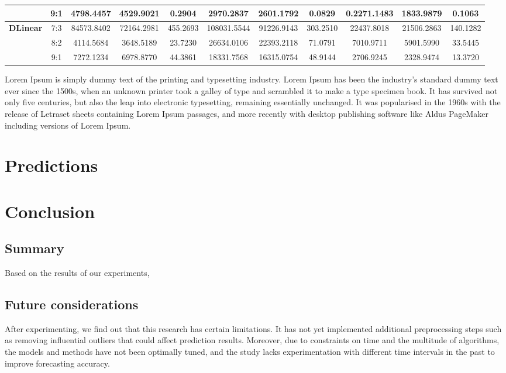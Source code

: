 \documentclass[conference]{IEEEtran}
\begin{document}
\begin{table}
\begin{tabular}{|c|c|c|c|c|c|c|c|c|c|c|}
            & 9:1 & 4798.4457 & 4529.9021 & 0.2904 & 2970.2837 & 2601.1792 & 0.0829 & 0.2271.1483 & 1833.9879 & 0.1063 \\ \hline
        \multirow{3}{*}{\textbf{DLinear}} 
            & 7:3 & 84573.8402 & 72164.2981 & 455.2693 & 108031.5544 & 91226.9143 & 303.2510 & 22437.8018 & 21506.2863 & 140.1282 \\
            & 8:2 & 4114.5684 & 3648.5189 & 23.7230 & 26634.0106 & 22393.2118 & 71.0791 & 7010.9711 & 5901.5990 & 33.5445 \\
            & 9:1 & 7272.1234 & 6978.8770 & 44.3861 & 18331.7568 & 16315.0754 & 48.9144 & 2706.9245 & 2328.9474 & 13.3720 \\ \hline
    \end{tabular}
\end{table}
\FloatBarrier
Lorem Ipsum is simply dummy text of the printing and typesetting industry. Lorem Ipsum has been the industry's standard dummy text ever since the 1500s, when an unknown printer took a galley of type and scrambled it to make a type specimen book. It has survived not only five centuries, but also the leap into electronic typesetting, remaining essentially unchanged. It was popularised in the 1960s with the release of Letraset sheets containing Lorem Ipsum passages, and more recently with desktop publishing software like Aldus PageMaker including versions of Lorem Ipsum.
\section{Predictions}

\section{Conclusion}
\subsection{Summary}
Based on the results of our experiments, 

\subsection{Future considerations}
After experimenting, we find out that this research has certain limitations. It has not yet implemented additional preprocessing steps such as removing influential outliers that could affect prediction results. Moreover, due to constraints on time and the multitude of algorithms, the models and methods have not been optimally tuned, and the study lacks experimentation with different time intervals in the past to improve forecasting accuracy.\par
\end{document}
